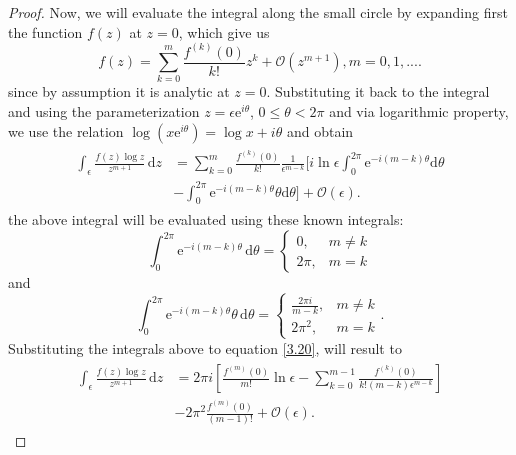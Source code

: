 \begin{proof}
Now, we will evaluate the integral along the small circle by expanding first the function $f(z)$ at $z=0$, which give us
\begin{equation}
    f(z) = \sum_{k=0}^{m} \frac{f^{(k)}(0)}{k!} z^k + \mathcal{O}(z^{m+1}), m = 0,1,....
\end{equation}
since by assumption it is analytic at $z=0$. Substituting it back to the integral and using the parameterization $z = \epsilon \mathrm{e}^{i \theta}$, $0 \leq \theta < 2 \pi$ and via logarithmic property, we use the relation $\log(x \mathrm{e}^{i \theta}) = \log x + i \theta$  and obtain
\begin{align}
\begin{split}
    \int_{\epsilon} \frac{f(z) \log z}{z^{m+1}} \,  \mathrm{d}z & = \sum_{k=0}^m \frac{f^{(k)}(0)}{k!} \frac{1}{\epsilon^{m-k}} \bigg[ i \ln \epsilon \int_0^{2 \pi} \mathrm{e}^{-i(m-k)\theta} \mathrm{d}\theta \\& - \int_0^{2 \pi} \mathrm{e}^{-i(m-k)\theta} \theta \mathrm{d}\theta  \bigg] + \mathcal{O}(\epsilon).
    \label{3.20}
\end{split}
\end{align}
the above integral will be evaluated using these known integrals:
\begin{equation}
    \int_0^{2 \pi} \mathrm{e}^{-i(m-k)\theta} \, \mathrm{d}\theta = 
    \begin{cases} 
      0, & m \neq k \\
      2 \pi, & m = k
   \end{cases}
\end{equation}
and
\begin{equation}
    \int_0^{2 \pi} \mathrm{e}^{-i(m-k)\theta} \theta \, \mathrm{d}\theta =     \begin{cases} 
      \frac{2 \pi i}{m-k}, & m \neq k \\
      2 \pi^2, & m = k
   \end{cases} .
\end{equation}
Substituting the integrals above to equation \eqref{3.20}, will result to
\begin{align}
\begin{split}
    \int_{\epsilon} \frac{f(z) \log z}{z^{m+1}} \,  \mathrm{d}z & = 2 \pi i \left[ \frac{f^{(m)}(0)}{m!} \ln \epsilon - \sum_{k=0}^{m-1} \frac{f^{(k)}(0)}{k!(m-k) \epsilon^{m-k}} \right] \\& - 2 \pi^{2} \frac{f^{(m)}(0)}{(m-1)!} + \mathcal{O}(\epsilon).
    \label{3.23}
\end{split}
\end{align}

\end{proof}
